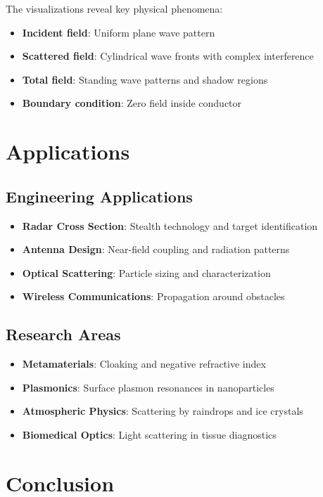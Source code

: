 \documentclass[11pt,a4paper]{article}
\begin{document}
The visualizations reveal key physical phenomena:

\begin{itemize}
\item \textbf{Incident field}: Uniform plane wave pattern
\item \textbf{Scattered field}: Cylindrical wave fronts with complex interference
\item \textbf{Total field}: Standing wave patterns and shadow regions
\item \textbf{Boundary condition}: Zero field inside conductor
\end{itemize}

\section{Applications}

\subsection{Engineering Applications}

\begin{itemize}
\item \textbf{Radar Cross Section}: Stealth technology and target identification
\item \textbf{Antenna Design}: Near-field coupling and radiation patterns
\item \textbf{Optical Scattering}: Particle sizing and characterization
\item \textbf{Wireless Communications}: Propagation around obstacles
\end{itemize}

\subsection{Research Areas}

\begin{itemize}
\item \textbf{Metamaterials}: Cloaking and negative refractive index
\item \textbf{Plasmonics}: Surface plasmon resonances in nanoparticles
\item \textbf{Atmospheric Physics}: Scattering by raindrops and ice crystals
\item \textbf{Biomedical Optics}: Light scattering in tissue diagnostics
\end{itemize}

\section{Conclusion}
\end{document}
